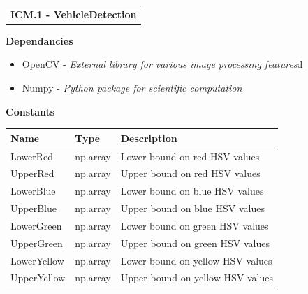 \documentclass [10pt]{article}
\begin{document}


















\begin{longtable}{p{}}
\rowcolor{subsectionC}\textbf{ICM.1 - VehicleDetection} \\
\end{longtable}
  

\textbf{Dependancies } 

\begin{itemize}
    \itemsep 0pt
    \item OpenCV - \textit{External library for various image processing features}d
    \item Numpy - \textit{Python package for scientific computation} 
\end{itemize}

\textbf{Constants}\\
\begin{longtable}{ |p{ }  p{ } p{}|}  \hline
 \textbf{Name} & \textbf{Type} & \textbf{Description} \\ \hline \rowcolor{tableCell}LowerRed&np.array&Lower bound on red HSV values \\ \hline
 UpperRed&np.array&Upper bound on red HSV values\\\hline 
 \rowcolor{tableCell}LowerBlue&np.array&Lower bound on blue HSV values \\\hline
 UpperBlue&np.array&Upper bound on blue HSV values\\\hline 
 \rowcolor{tableCell}LowerGreen&np.array&Lower bound on green HSV values \\\hline
 UpperGreen&np.array&Upper bound on green HSV values \\\hline 
 \rowcolor{tableCell}LowerYellow&np.array&Lower bound on yellow HSV values \\ \hline
 UpperYellow&np.array&Upper bound on yellow HSV values\\\hline 
\end{longtable}
\end{document}
